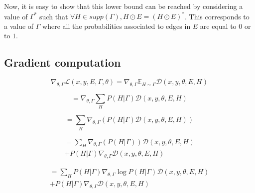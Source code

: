 \documentclass[10pt,twocolumn,letterpaper]{article}
\begin{document}
Now, it is easy to show that this lower bound can be reached by considering a value of $\Gamma^*$ such that $\forall H \in supp(\Gamma), H \odot E = (H \odot E)^*$. This corresponds to a value of $\Gamma$ where all the probabilities associated to edges in $E$ are equal to $0$ or to $1$.


\newpage


\subsection*{Gradient computation}



\begin{equation}
\nabla_{\theta,\Gamma} \mathcal{L}(x,y,E,\Gamma,\theta) = \nabla_{\theta,\Gamma} \mathbb{E}_{H \sim \Gamma} \mathcal{D}(x,y,\theta,E,H)
\end{equation}

\begin{equation}
= \nabla_{\theta,\Gamma} \sum\limits_H P(H|\Gamma) \mathcal{D}(x,y,\theta,E,H)
\end{equation}

\begin{equation}
= \sum\limits_H \nabla_{\theta,\Gamma} (P(H|\Gamma) \mathcal{D}(x,y,\theta,E,H))
\end{equation}

\begin{multline}
= \sum\limits_H \nabla_{\theta,\Gamma} (P(H|\Gamma))\mathcal{D}(x,y,\theta,E,H) \\+ P(H|\Gamma) \nabla_{\theta,\Gamma} \mathcal{D}(x,y,\theta,E,H)
\end{multline}

\begin{multline}
= \sum\limits_H P(H|\Gamma)\nabla_{\theta,\Gamma} \log P(H|\Gamma) \mathcal{D}(x,y,\theta,E,H) \\+ P(H|\Gamma) \nabla_{\theta,\Gamma} \mathcal{D}(x,y,\theta,E,H)
\end{multline}
\end{document}

